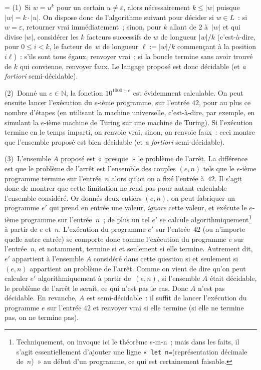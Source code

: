 \documentclass[12pt,a4paper]{article}
\theoremstyle{definition}
\newif\ifcorrige
\newenvironment{corrige}%
{\ifcorrige\relax\else\setbox0=\vbox\bgroup\fi%
\smallbreak\footnotesize\noindent{\underbar{\textit{Corrigé.}}\quad}}
{{\hbox{}\nobreak\hfill\checkmark}%
\ifcorrige\relax\else\egroup\fi\par}
\begin{document}
\begin{corrige}
(1) Si $w = u^k$ pour un certain $u\neq\varepsilon$, alors
  nécessairement $k\leq |w|$ puisque $|w|=k\cdot|u|$.  On dispose donc
  de l'algorithme suivant pour décider si $w\in L$ : si
  $w=\varepsilon$, retourner vrai immédiatement ; sinon, pour $k$
  allant de $2$ à $|w|$ et qui divise $|w|$, considérer les $k$
  facteurs successifs de $w$ de longueur $|w|/k$ (c'est-à-dire, pour
  $0\leq i<k$, le facteur de $w$ de longueur $\ell := |w|/k$
  commençant à la position $i \ell$) : s'ils sont tous égaux, renvoyer
  vrai ; si la boucle termine sans avoir trouvé de $k$ qui convienne,
  renvoyer faux.  Le langage proposé est donc décidable (et \textit{a
    fortiori} semi-décidable).

\smallbreak

(2) Donné un $e \in \mathbb{N}$, la fonction $10^{1000+e}$ est
  évidemment calculable.  On peut ensuite lancer l'exécution du
  $e$-ième programme, sur l'entrée $42$, pour au plus ce nombre
  d'étapes (en utilisant la machine universelle, c'est-à-dire, par
  exemple, en simulant la $e$-ième machine de Turing sur une machine
  de Turing).  Si l'exécution termine en le temps imparti, on renvoie
  vrai, sinon, on renvoie faux : ceci montre que l'ensemble proposé
  est bien décidable (et \textit{a fortiori} semi-décidable).

\smallbreak

(3) L'ensemble $A$ proposé est « presque » le problème de l'arrêt.  La
  différence est que le problème de l'arrêt est l'ensemble des couples
  $(e,n)$ tels que le $e$-ième programme termine sur l'entrée $n$
  alors qu'ici on a fixé l'entrée à $42$.  Il s'agit donc de montrer
  que cette limitation ne rend pas pour autant calculable l'ensemble
  considéré.  Or donnés deux entiers $(e,n)$, on peut fabriquer un
  programme $e'$ qui prend en entrée une valeur, \emph{ignore} cette
  valeur, et exécute le $e$-ième programme sur l'entrée $n$ ; de plus
  un tel $e'$ se calcule algorithmiquement\footnote{Techniquement, on
    invoque ici le théorème s-m-n ; mais dans les faits, il s'agit
    essentiellement d'ajouter une ligne « \texttt{let
      n=}(représentation décimale de $n$) » au début d'un programme,
    ce qui est certainement faisable.} à partir de $e$ et $n$.
  L'exécution du programme $e'$ sur l'entrée $42$ (ou n'importe quelle
  autre entrée) se comporte donc comme l'exécution du programme $e$
  sur l'entrée $n$, et notamment, termine si et seulement si elle
  termine.  Autrement dit, $e'$ appartient à l'ensemble $A$ considéré
  dans cette question si et seulement si $(e,n)$ appartient au
  problème de l'arrêt.  Comme on vient de dire qu'on peut calculer
  $e'$ algorithmiquement à partir de $(e,n)$, si l'ensemble $A$ était
  décidable, le problème de l'arrêt le serait, ce qui n'est pas le
  cas.  Donc $A$ n'est pas décidable.  En revanche, $A$ est
  semi-décidable : il suffit de lancer l'exécution du programme $e$
  sur l'entrée $42$ et renvoyer vrai si elle termine (si elle ne
  termine pas, on ne termine pas).
\end{corrige}
\end{document}
